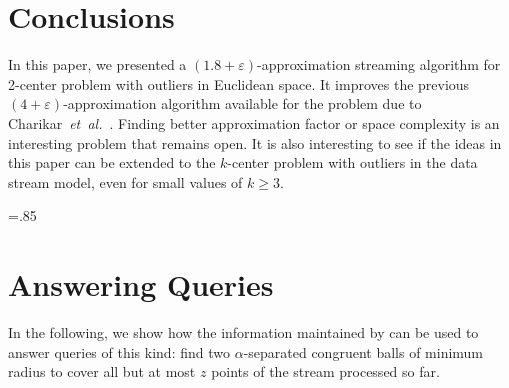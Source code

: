 \documentclass[envcountsame]{cls/cccg15}
\renewcommand{\O}{\ensuremath{{O}}}
\newcommand{\gee}{\geqslant}
\renewcommand{\ge}{\gee}
\newcommand{\eps}{\varepsilon}
\newcommand{\etal}{{\em et~al.\/}}
\begin{document}
%


\section{Conclusions}
\label{sec:conc}

In this paper, we presented a $(1.8 + \eps)$-approximation streaming algorithm for 2-center problem with outliers in Euclidean space.
It improves the previous $(4+\eps)$-approximation algorithm available for the problem 
due to Charikar~\etal~\cite{mccutchen2008streaming}. 
Finding better approximation factor or space complexity
is an interesting problem that remains open.
It is also interesting to see if the ideas in this paper 
can be extended to the $k$-center problem with outliers in the data stream model,
even for small values of $k \ge 3$.




{
\small
\baselineskip=.85\baselineskip


}



\appendix 



\section{Answering Queries}
\label{sec:query}

In the following, we show how the information maintained 
by  can be used to answer queries of this kind:
find two $\alpha$-separated congruent balls of minimum radius
to cover all but at most $z$ points of the stream processed so far.
\end{document}
